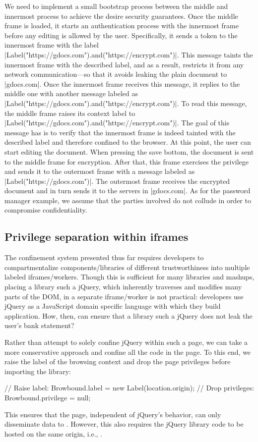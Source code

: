 We need to implement a small bootstrap process between the middle and innermost
process to achieve the desire security guarantees. Once the middle frame is
loaded, it starts an authentication process with the innermost frame before any
editing is allowed by the user. Specifically, it sends a token to the innermost
frame with the label \js|Label("https://gdocs.com").and("https://encrypt.com")|.
This message taints the innermost frame with the described label, and as a
result, restricts it from any network communication---so that it avoids leaking
the plain document to \js|gdocs.com|. Once the innermost frame receives this
message, it replies to the middle one with another message labeled as
\js|Label("https://gdocs.com").and("https://encrypt.com")|. To read this
message, the middle frame raises its context label to
\js|Label("https://gdocs.com").and("https://encrypt.com")|. The goal of this
message has is to verify that the innermost frame is indeed tainted with the
described label and therefore confined to the browser. At this point, the user
can start editing the document.  When pressing the save bottom, the document is
sent to the middle frame for encryption. After that, this frame exercises the
privilege  and sends it to the outermost frame with a message
labeled as \js|Label("https://gdocs.com")|. The outermost frame receives the
encrypted document and in turn sends it to the servers in \js|gdocs.com|. As for
the password manager example, we assume that the parties involved do not collude
in order to compromise confidentiality. 




\subsection{Privilege separation within iframes}
\label{sec:system:script}

The confinement system presented thus far requires developers to
compartmentalize components/libraries of different trustworthiness into
multiple labeled iframes/workers.
%
Though this is sufficient for many libraries and mashups, placing a library
such a jQuery, which inherently traverses and modifies many parts of the DOM,
in a separate iframe/worker is not practical: developers use jQuery as a
JavaScript domain specific language with which they build application.
%
How, then, can  ensure that a library such a jQuery does not
leak the user's bank statement?

Rather than attempt to solely confine jQuery within such a page, we
can take a more conservative approach and confine all the code in the
page.
%
To this end, we raise the label of the browsing context and drop the
page privileges before importing the library:
\begin{jscode}
// Raise label:
Browbound.label = new Label(location.origin);
// Drop privileges:
Browbound.privilege = null;
\end{jscode}
%
This ensures that the page, independent of jQuery's behavior, can only
disseminate data to .
%
However, this also requires the jQuery library code to be hosted on
the same origin, i.e., .
%

